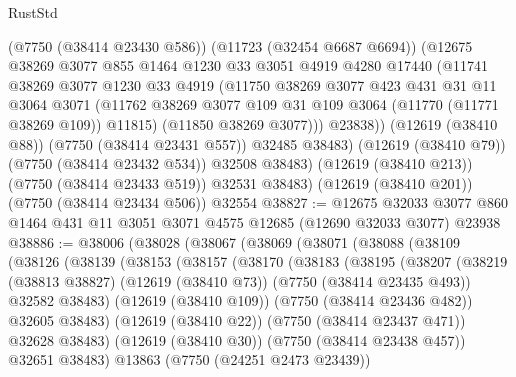 \begin{lexlean}{RustStd}
\begin{coremodule}
            (@7750 (@38414 @23430 @586))
            (@11723 (@32454 @6687 @6694))
            (@12675
              @38269
              @3077
              @855
              @1464
              @1230
              @33
              @3051
              @4919
              @4280
              @17440
              (@11741
                @38269
                @3077
                @1230
                @33
                @4919
                (@11750
                  @38269
                  @3077
                  @423
                  @431
                  @31
                  @11
                  @3064
                  @3071
                  (@11762 @38269 @3077 @109 @31 @109 @3064 (@11770 (@11771 @38269 @109)) @11815)
                  (@11850 @38269 @3077)))
              @23838))
          (@12619 (@38410 @88))
          (@7750 (@38414 @23431 @557))
          @32485
          @38483)
        (@12619 (@38410 @79))
        (@7750 (@38414 @23432 @534))
        @32508
        @38483)
      (@12619 (@38410 @213))
      (@7750 (@38414 @23433 @519))
      @32531
      @38483)
    (@12619 (@38410 @201))
    (@7750 (@38414 @23434 @506))
    @32554
@38827 := @12675
    @32033
    @3077
    @860
    @1464
    @431
    @11
    @3051
    @3071
    @4575
    @12685
    (@12690 @32033 @3077)
    @23938
@38886 := @38006
    (@38028
      (@38067
        (@38069
          (@38071
            (@38088
              (@38109
                (@38126
                  (@38139
                    (@38153
                      (@38157
                        (@38170
                          (@38183
                            (@38195
                              (@38207
                                (@38219
                                  (@38813 @38827)
                                  (@12619 (@38410 @73))
                                  (@7750 (@38414 @23435 @493))
                                  @32582
                                  @38483)
                                (@12619 (@38410 @109))
                                (@7750 (@38414 @23436 @482))
                                @32605
                                @38483)
                              (@12619 (@38410 @22))
                              (@7750 (@38414 @23437 @471))
                              @32628
                              @38483)
                            (@12619 (@38410 @30))
                            (@7750 (@38414 @23438 @457))
                            @32651
                            @38483)
                          @13863
                          (@7750 (@24251 @2473 @23439))

\end{coremodule}
\end{lexlean}
